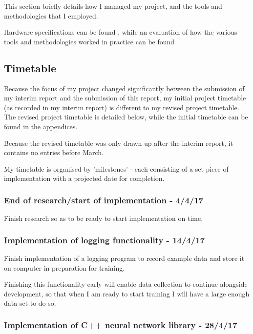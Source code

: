 \documentclass[a4paper]{article}
\begin{document}
This section briefly details how I managed my project, and the tools and methodologies that I employed. 

Hardware specifications can be found , while an evaluation of how the various tools and methodologies worked in practice can be found 

\subsection{Timetable}%

Because the focus of my project changed significantly between the submission of my interim report and the submission of this report, my initial project timetable (as recorded in my interim report) is different to my revised project timetable. The revised project timetable is detailed below, while the initial timetable can be found in the appendices.

Because the revised timetable was only drawn up after the interim report, it contains no entries before March.

My timetable is organised by 'milestones' - each consisting of a set piece of implementation with a projected date for completion.

\subsubsection{End of research/start of implementation - 4/4/17}

Finish research so as to be ready to start implementation on time.

\subsubsection{Implementation of logging functionality - 14/4/17}

Finish implementation of a logging program to record example data and store it on computer in preparation for training.

Finishing this functionality early will enable data collection to continue alongside development, so that when I am ready to start training I will have a large enough data set to do so.

\subsubsection{Implementation of C++ neural network library - 28/4/17}
\end{document}
